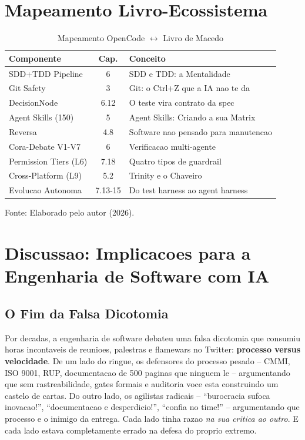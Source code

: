 \documentclass[12pt,a4paper,oneside,sumario=tradicional,chapter=TITLE,section=TITLE,subsection=TITLE,english,brazil]{abntex2}
\begin{document}
\section{Mapeamento Livro-Ecossistema}

\begin{table}[H]\centering\caption{Mapeamento OpenCode $\leftrightarrow$ Livro de Macedo}\label{tab:map}
\begin{tabular}{lcl}\toprule\textbf{Componente} & \textbf{Cap.} & \textbf{Conceito} \\\midrule
SDD+TDD Pipeline & 6 & SDD e TDD: a Mentalidade \\
Git Safety & 3 & Git: o Ctrl+Z que a IA nao te da \\
DecisionNode & 6.12 & O teste vira contrato da spec \\
Agent Skills (150) & 5 & Agent Skills: Criando a sua Matrix \\
Reversa & 4.8 & Software nao pensado para manutencao \\
Cora-Debate V1-V7 & 6 & Verificacao multi-agente \\
Permission Tiers (L6) & 7.18 & Quatro tipos de guardrail \\
Cross-Platform (L9) & 5.2 & Trinity e o Chaveiro \\
Evolucao Autonoma & 7.13-15 & Do test harness ao agent harness \\\bottomrule
\end{tabular}
\small\vspace{2pt}Fonte: Elaborado pelo autor (2026).\smallskip
\end{table}

\section{Discussao: Implicacoes para a Engenharia de Software com IA}

\subsection{O Fim da Falsa Dicotomia}

Por decadas, a engenharia de software debateu uma falsa dicotomia que consumiu horas incontaveis de reunioes, palestras e flamewars no Twitter: \textbf{processo versus velocidade}. De um lado do ringue, os defensores do processo pesado -- CMMI, ISO 9001, RUP, documentacao de 500 paginas que ninguem le -- argumentando que sem rastreabilidade, gates formais e auditoria voce esta construindo um castelo de cartas. Do outro lado, os agilistas radicais -- ``burocracia sufoca inovacao!'', ``documentacao e desperdicio!'', ``confia no time!'' -- argumentando que processo e o inimigo da entrega. Cada lado tinha razao \textit{na sua critica ao outro}. E cada lado estava completamente errado na defesa do proprio extremo.
\end{document}
